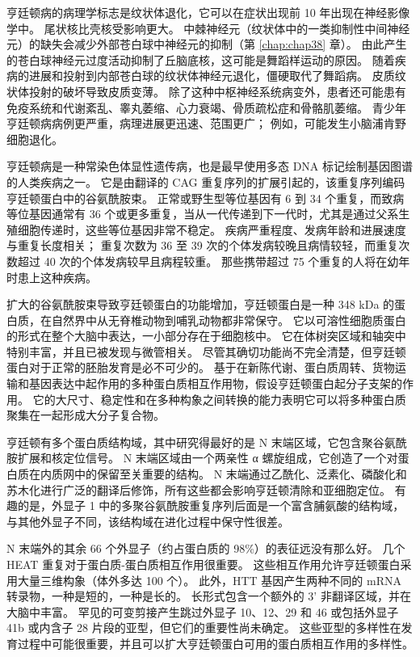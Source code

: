 亨廷顿病的病理学标志是纹状体退化，它可以在症状出现前 10 年出现在神经影像学中。 尾状核比壳核受影响更大。 中棘神经元（纹状体中的一类抑制性中间神经元）的缺失会减少外部苍白球中神经元的抑制（第 \ref{chap:chap38} 章）。 由此产生的苍白球神经元过度活动抑制了丘脑底核，这可能是舞蹈样运动的原因。 随着疾病的进展和投射到内部苍白球的纹状体神经元退化，僵硬取代了舞蹈病。 皮质纹状体投射的破坏导致皮质变薄。 除了这种中枢神经系统病变外，患者还可能患有免疫系统和代谢紊乱、睾丸萎缩、心力衰竭、骨质疏松症和骨骼肌萎缩。 青少年亨廷顿病病例更严重，病理进展更迅速、范围更广； 例如，可能发生小脑浦肯野细胞退化。

亨廷顿病是一种常染色体显性遗传病，也是最早使用多态 DNA 标记绘制基因图谱的人类疾病之一。 它是由翻译的 CAG 重复序列的扩展引起的，该重复序列编码亨廷顿蛋白中的谷氨酰胺束。 正常或野生型等位基因有 6 到 34 个重复，而致病等位基因通常有 36 个或更多重复，当从一代传递到下一代时，尤其是通过父系生殖细胞传递时，这些等位基因非常不稳定。 疾病严重程度、发病年龄和进展速度与重复长度相关； 重复次数为 36 至 39 次的个体发病较晚且病情较轻，而重复次数超过 40 次的个体发病较早且病程较重。 那些携带超过 75 个重复的人将在幼年时患上这种疾病。

扩大的谷氨酰胺束导致亨廷顿蛋白的功能增加，亨廷顿蛋白是一种 348 kDa 的蛋白质，在自然界中从无脊椎动物到哺乳动物都非常保守。 它以可溶性细胞质蛋白的形式在整个大脑中表达，一小部分存在于细胞核中。 它在体树突区域和轴突中特别丰富，并且已被发现与微管相关。 尽管其确切功能尚不完全清楚，但亨廷顿蛋白对于正常的胚胎发育是必不可少的。 基于在新陈代谢、蛋白质周转、货物运输和基因表达中起作用的多种蛋白质相互作用物，假设亨廷顿蛋白起分子支架的作用。 它的大尺寸、稳定性和在多种构象之间转换的能力表明它可以将多种蛋白质聚集在一起形成大分子复合物。

亨廷顿有多个蛋白质结构域，其中研究得最好的是 N 末端区域，它包含聚谷氨酰胺扩展和核定位信号。 N 末端区域由一个两亲性 α 螺旋组成，它创造了一个对蛋白质在内质网中的保留至关重要的结构。 N 末端通过乙酰化、泛素化、磷酸化和苏木化进行广泛的翻译后修饰，所有这些都会影响亨廷顿清除和亚细胞定位。 有趣的是，外显子 1 中的多聚谷氨酰胺重复序列后面是一个富含脯氨酸的结构域，与其他外显子不同，该结构域在进化过程中保守性很差。

N 末端外的其余 66 个外显子（约占蛋白质的 98\%）的表征远没有那么好。 几个 HEAT 重复对于蛋白质-蛋白质相互作用很重要。 这些相互作用允许亨廷顿蛋白采用大量三维构象（体外多达 100 个）。 此外，HTT 基因产生两种不同的 mRNA 转录物，一种是短的，一种是长的。 长形式包含一个额外的 3' 非翻译区域，并在大脑中丰富。 罕见的可变剪接产生跳过外显子 10、12、29 和 46 或包括外显子 41b 或内含子 28 片段的亚型，但它们的重要性尚未确定。 这些亚型的多样性在发育过程中可能很重要，并且可以扩大亨廷顿蛋白可用的蛋白质相互作用的多样性。


